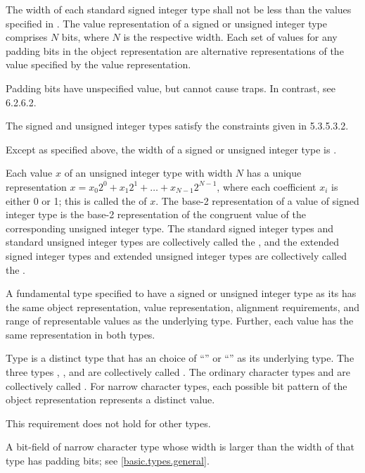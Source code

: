 \pnum
The width of each standard signed integer type
shall not be less than the values specified in .
The value representation of a signed or unsigned integer type
comprises $N$ bits, where $N$ is the respective width.
Each set of values for any padding bits
in the object representation are
alternative representations of the value specified by the value representation.
\begin{note}
Padding bits have unspecified value, but cannot cause traps.
In contrast, see \IsoC{} 6.2.6.2.
\end{note}
\begin{note}
The signed and unsigned integer types satisfy
the constraints given in \IsoC{} 5.3.5.3.2.
\end{note}
Except as specified above,
the width of a signed or unsigned integer type is
.

\pnum
Each value $x$ of an unsigned integer type with width $N$ has
a unique representation $x = x_0 2^0 + x_1 2^1 + \ldots + x_{N-1} 2^{N-1}$,
where each coefficient $x_i$ is either 0 or 1;
this is called the  of $x$.
The base-2 representation of a value of signed integer type is
the base-2 representation of the congruent value
of the corresponding unsigned integer type.
The standard signed integer types and standard unsigned integer types
are collectively called the , and the extended
signed integer types and extended
unsigned integer types are collectively called the
.

\pnum
A fundamental type specified to have
a signed or unsigned integer type as its  has
the same object representation,
value representation,
alignment requirements, and
range of representable values as the underlying type.
Further, each value has the same representation in both types.

\pnum
{}%
%
%
%
%
%
Type  is a distinct type
that has an  choice of
``'' or ``'' as its underlying type.
The three types , , and 
are collectively called
.
The ordinary character types and 
are collectively called .
For narrow character types,
each possible bit pattern of the object representation represents
a distinct value.
\begin{note}
This requirement does not hold for other types.
\end{note}
\begin{note}
A bit-field of narrow character type whose width is larger than
the width of that type has padding bits; see \ref{basic.types.general}.
\end{note}

